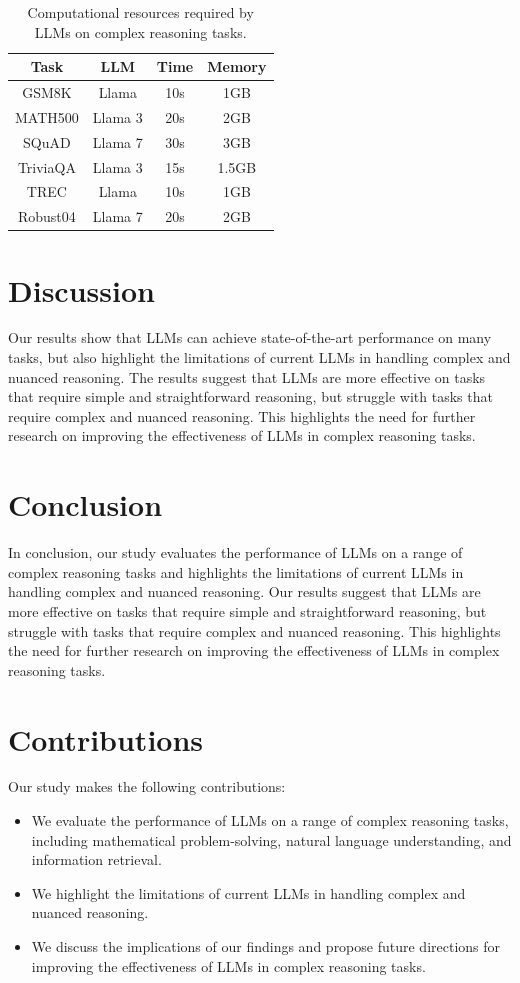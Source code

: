\documentclass{article}
\begin{document}
\begin{table}[H]
\centering
\begin{tabular}{|c|c|c|c|}
\hline
\textbf{Task} & \textbf{LLM} & \textbf{Time} & \textbf{Memory} \\ \hline
GSM8K & Llama & 10s & 1GB \\ \hline
MATH500 & Llama 3 & 20s & 2GB \\ \hline
SQuAD & Llama 7 & 30s & 3GB \\ \hline
TriviaQA & Llama 3 & 15s & 1.5GB \\ \hline
TREC & Llama & 10s & 1GB \\ \hline
Robust04 & Llama 7 & 20s & 2GB \\ \hline
\end{tabular}
\caption{Computational resources required by LLMs on complex reasoning tasks.}
\end{table}

\section{Discussion}
Our results show that LLMs can achieve state-of-the-art performance on many tasks, but also highlight the limitations of current LLMs in handling complex and nuanced reasoning. The results suggest that LLMs are more effective on tasks that require simple and straightforward reasoning, but struggle with tasks that require complex and nuanced reasoning. This highlights the need for further research on improving the effectiveness of LLMs in complex reasoning tasks.

\section{Conclusion}
In conclusion, our study evaluates the performance of LLMs on a range of complex reasoning tasks and highlights the limitations of current LLMs in handling complex and nuanced reasoning. Our results suggest that LLMs are more effective on tasks that require simple and straightforward reasoning, but struggle with tasks that require complex and nuanced reasoning. This highlights the need for further research on improving the effectiveness of LLMs in complex reasoning tasks.

\section{Contributions}
Our study makes the following contributions:

\begin{itemize}
\item We evaluate the performance of LLMs on a range of complex reasoning tasks, including mathematical problem-solving, natural language understanding, and information retrieval.
\item We highlight the limitations of current LLMs in handling complex and nuanced reasoning.
\item We discuss the implications of our findings and propose future directions for improving the effectiveness of LLMs in complex reasoning tasks.
\end{itemize}
\end{document}
